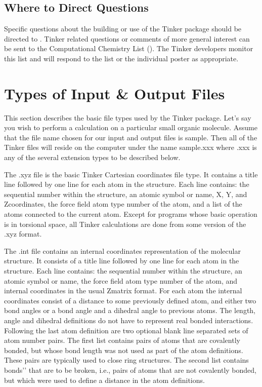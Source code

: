 \documentclass[letterpaper,11pt,english]{sphinxmanual}
\begin{document}
\section{Where to Direct Questions}
\label{\detokenize{text/installation:where-to-direct-questions}}
Specific questions about the building or use of the Tinker package should be directed to . Tinker related questions or comments of more general interest can be sent to the Computational Chemistry List (). The Tinker developers monitor this list and will respond to the list or the individual poster as appropriate.


\chapter{Types of Input \& Output Files}
\label{\detokenize{text/file-types:types-of-input-output-files}}\label{\detokenize{text/file-types::doc}}
This section describes the basic file types used by the Tinker package. Let’s say you wish to perform a calculation on a particular small organic molecule. Assume that the file name chosen for our input and output files is sample. Then all of the Tinker files will reside on the computer under the name sample.xxx where .xxx is any of the several extension types to be described below.


The .xyz file is the basic Tinker Cartesian coordinates file type. It contains a title line followed by one line for each atom in the structure. Each line contains: the sequential number within the structure, an atomic symbol or name, X\sphinxhyphen{}, Y\sphinxhyphen{}, and Z\sphinxhyphen{}coordinates, the force field atom type number of the atom, and a list of the atoms connected to the current atom. Except for programs whose basic operation is in torsional space, all Tinker calculations are done from some version of the .xyz format.


The .int file contains an internal coordinates representation of the molecular structure. It consists of a title line followed by one line for each atom in the structure. Each line contains: the sequential number within the structure, an atomic symbol or name, the force field atom type number of the atom, and internal coordinates in the usual Z\sphinxhyphen{}matrix format. For each atom the internal coordinates consist of a distance to some previously defined atom, and either two bond angles or a bond angle and a dihedral angle to previous atoms. The length, angle and dihedral definitions do not have to represent real bonded interactions. Following the last atom definition are two optional blank line separated sets of atom number pairs. The first list contains pairs of atoms that are covalently bonded, but whose bond length was not used as part of the atom definitions. These pairs are typically used to close ring structures. The second list contains {\color{red}\bfseries{}\textasciigrave{}\textasciigrave{}}bonds’’ that are to be broken, i.e., pairs of atoms that are not covalently bonded, but which were used to define a distance in the atom definitions.
\end{document}
